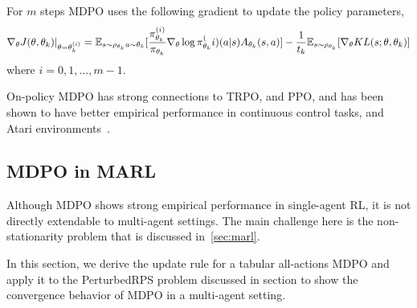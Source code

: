For $m$ steps MDPO uses the following gradient to update the policy parameters, 
\begin{equation}
	\label{eqn:mdpograd}
	\nabla_{\theta} J(\theta, \theta_k)|_{\theta = \theta_k^{(i)}} = \mathbb{E}_{s \sim \rho_{\theta_k} \\ a \sim \theta_k} 
	[\frac{\pi_{\theta_k}^{(i)}}{\pi_{\theta_k}} \nabla_{\theta} \log \pi_{\theta_k}^(i) (a|s) A_{\theta_k}(s,a)] - 
	\frac{1}{t_k} \mathbb{E}_{s \sim \rho_{\theta_k}} [\nabla_\theta KL(s; \theta, \theta_k)]
\end{equation}
where $i=0,1,\ldots,m-1$.







On-policy MDPO has strong connections to TRPO, and PPO, and has been shown to have better empirical performance 
in continuous control tasks, and Atari environments~\cite{tomarMirror2022}.

\subsection{MDPO in MARL}
Although MDPO shows strong empirical performance in single-agent RL, it is not directly extendable to multi-agent settings.
The main challenge here is the non-stationarity problem that is discussed in~\ref{sec:marl}.

In this section, we derive the update rule for a tabular all-actions MDPO and apply it to the PerturbedRPS problem discussed in section 
 to show 
the convergence behavior of MDPO in a multi-agent setting.

